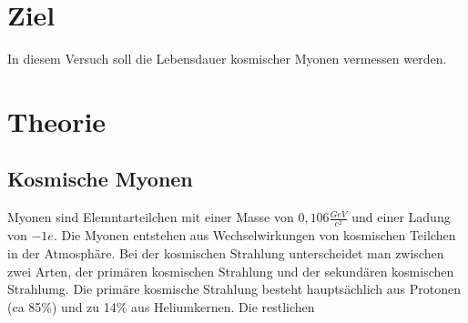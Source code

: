 \section{Ziel}
In diesem Versuch soll die Lebensdauer kosmischer Myonen vermessen werden.
\section{Theorie}
\label{sec:Theorie}
\subsection{Kosmische Myonen}
Myonen sind Elemntarteilchen mit einer Masse von $0,106 \frac{GeV}{c^2}$ und einer Ladung von $-1 e$.
Die Myonen entstehen aus Wechselwirkungen von kosmischen Teilchen in der Atmosphäre.
Bei der kosmischen Strahlung unterscheidet man zwischen zwei Arten, der primären kosmischen Strahlung und der sekundären kosmischen Strahlumg.
Die primäre kosmische Strahlung besteht hauptsächlich aus Protonen (ca 85\%) und zu 14\% aus Heliumkernen. Die restlichen 
